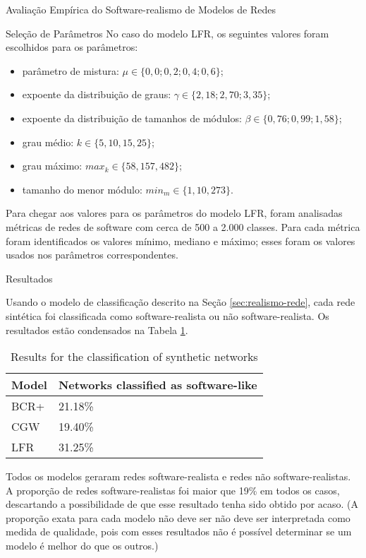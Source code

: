 \begin{section}{Avaliação Empírica do Software-realismo de Modelos de Redes}
\begin{subsection}{Seleção de Parâmetros}
No caso do modelo LFR, os seguintes valores foram escolhidos para os parâmetros:

\begin{itemize}
	\item parâmetro de mistura: $\mu \in \{0,0; 0,2; 0,4; 0,6\}$;
	\item expoente da distribuição de graus: $\gamma \in \{2,18; 2,70; 3,35\}$;
	\item expoente da distribuição de tamanhos de módulos: $\beta \in \{0,76; 0,99; 1,58\}$;
	\item grau médio: $k \in \{5, 10, 15, 25\}$;
	\item grau máximo: $max_k \in \{58, 157, 482\}$;
	\item tamanho do menor módulo: $min_m \in \{1, 10, 273\}$.
\end{itemize}

Para chegar aos valores para os parâmetros do modelo LFR, foram analisadas métricas de redes de software com cerca de 500 a 2.000 classes. Para cada métrica foram identificados os valores mínimo, mediano e máximo; esses foram os valores usados nos parâmetros correspondentes.
\end{subsection}

\begin{subsection}{Resultados}

Usando o modelo de classificação descrito na Seção \ref{sec:realismo-rede}, cada rede sintética foi classificada como software-realista ou não software-realista. Os resultados estão condensados na Tabela \ref{tab:results}.

\begin{table}
\caption{Results for the classification of synthetic networks}
\centering
\begin{tabular}{|l|l|}
\hline
Model & Networks classified as software-like \\
\hline 
\hline
BCR+ & 21.18\% \\ %
\hline
CGW  & 19.40\% \\  %
\hline
LFR  & 31.25\% \\ %
\hline
\end{tabular}
\label{tab:results}
\end{table}

Todos os modelos geraram redes software-realista e redes não software-realistas. A proporção de redes software-realistas foi maior que 19\% em todos os casos, descartando a possibilidade de que esse resultado tenha sido obtido por acaso. (A proporção exata para cada modelo não deve ser não deve ser interpretada como medida de qualidade, pois com esses resultados não é possível determinar se um modelo é melhor do que os outros.)


\end{subsection}
\end{section}
